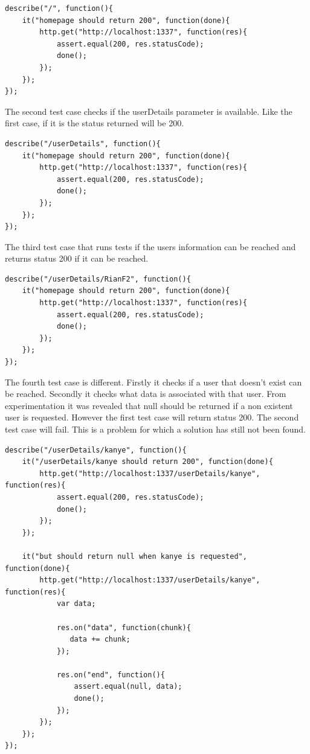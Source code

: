 \documentclass[12pt]{article}
\begin{document}
\begin{lstlisting}
describe("/", function(){
    it("homepage should return 200", function(done){
        http.get("http://localhost:1337", function(res){
            assert.equal(200, res.statusCode);
            done();
        });
    });
});
\end{lstlisting}

The second test case checks if the userDetails parameter is available. Like the first case, if it is the status returned will be 200.

\begin{lstlisting}
describe("/userDetails", function(){
    it("homepage should return 200", function(done){
        http.get("http://localhost:1337", function(res){
            assert.equal(200, res.statusCode);
            done();
        });
    });
});
\end{lstlisting}

The third test case that runs tests if the users information can be reached and returns status 200 if it can be reached.

\begin{lstlisting}
describe("/userDetails/RianF2", function(){
    it("homepage should return 200", function(done){
        http.get("http://localhost:1337", function(res){
            assert.equal(200, res.statusCode);
            done();
        });
    });
});
\end{lstlisting}

The fourth test case is different. Firstly it checks if a user that doesn't exist can be reached. Secondly it checks what data is associated with that user. From experimentation it was revealed that null should be returned if a non existent user is requested. However the first test case will return status 200. The second test case will fail. This is a problem for which a solution has still not been found. 

\begin{lstlisting}
describe("/userDetails/kanye", function(){
    it("/userDetails/kanye should return 200", function(done){
        http.get("http://localhost:1337/userDetails/kanye", function(res){
            assert.equal(200, res.statusCode);
            done();
        });
    });

    it("but should return null when kanye is requested", function(done){
        http.get("http://localhost:1337/userDetails/kanye", function(res){
            var data;

            res.on("data", function(chunk){
               data += chunk;
            });

            res.on("end", function(){
                assert.equal(null, data);
                done();
            });
        });
    });
});
\end{lstlisting}
\end{document}
